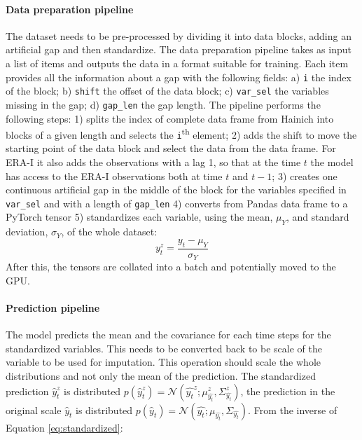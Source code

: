 \documentclass{article}
\newcommand{\norm}[3]{\mathcal{N}\left(#1; #2, #3\right)} %
\begin{document}
\paragraph{Data preparation pipeline}

The dataset needs to be pre-processed by dividing it into data blocks, adding an artificial gap and then standardize. The data preparation pipeline takes as input a list of items and outputs the data in a format suitable for training. Each item provides all the information about a gap with the following fields: a) \verb|i| the index of the block; b) \verb|shift|  the offset of the data block; c) \verb|var_sel| the variables missing in the gap; d) \verb|gap_len| the gap length. The pipeline performs the following steps: 1) splits the index of complete data frame from Hainich into blocks of a given length and selects the \texttt{i}\textsuperscript{th} element;  2) adds the shift to move the starting point of the data block and select the data from the data frame. For ERA-I it also adds the observations with a lag 1, so that at the time $t$ the model has access to the ERA-I observations both at time $t$ and $t-1$; 3) creates one continuous artificial gap in the middle of the block for the variables specified in \verb|var_sel| and with a length of \verb|gap_len| 4) converts from \textsf{Pandas} data frame to a \textsf{PyTorch} tensor 5) standardizes each variable, using the mean, $\mu_Y$, and standard deviation, $\sigma_Y$, of the whole dataset:
\begin{equation}\label{eq:standardized}
    y^z_t = \frac{y_t - \mu_Y}{\sigma_Y}
\end{equation}
After this, the tensors are collated into a batch and potentially moved to the GPU.

\paragraph{Prediction pipeline} The model predicts the mean and the covariance for each time steps for the standardized variables. This needs to be converted back to be scale of the variable to be used for imputation. This operation should scale the whole distributions and not only the mean of the prediction. The standardized prediction $\hat{y}^z_t$ is distributed $p(\hat{y}^z_t) = \norm{\hat{y_t}^z}{\mu^z_{\hat{y_t}}}{\Sigma^z_{\hat{y_t}}}$, the prediction in the original scale $\hat{y}_t$ is distributed $p(\hat{y}_t) =  \norm{\hat{y_t}}{\mu_{\hat{y_t}}}{\Sigma_{\hat{y_t}}}$. From the inverse of Equation \ref{eq:standardized}:
\end{document}
